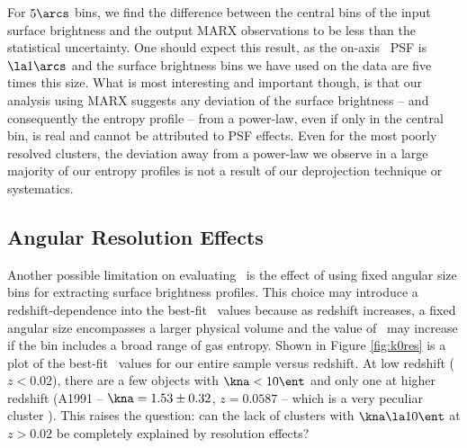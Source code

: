 For $5\arcs$ bins, we find the difference between the central bins
of the input surface brightness and the output MARX observations to be
less than the statistical uncertainty. One should expect this result,
as the on-axis \chandra\ PSF is $\la 1\arcs$ and the surface
brightness bins we have used on the data are five times this
size. What is most interesting and important though, is that our
analysis using MARX suggests any deviation of the surface brightness
-- and consequently the entropy profile -- from a power-law, even if
only in the central bin, is real and cannot be attributed to PSF
effects. Even for the most poorly resolved clusters, the deviation
away from a power-law we observe in a large majority of our entropy
profiles is not a result of our deprojection technique or systematics.

\subsection{Angular Resolution Effects}
\label{sec:entsuppangres}

Another possible limitation on evaluating \kna\ is the effect of using
fixed angular size bins for extracting surface brightness
profiles. This choice may introduce a redshift-dependence into the
best-fit \kna\ values because as redshift increases, a fixed angular
size encompasses a larger physical volume and the value of \kna\ may
increase if the bin includes a broad range of gas entropy. Shown in
Figure \ref{fig:k0res} is a plot of the best-fit \kna\ values for our
entire sample versus redshift. At low redshift ($z < 0.02$), there are
a few objects with $\kna < 10 \ent$ and only one at higher redshift
(A1991 -- $\kna = 1.53 \pm 0.32$, $z = 0.0587$ -- which is a very
peculiar cluster \citep{2004ApJ...613..180S}). This raises the
question: can the lack of clusters with $\kna \la 10 \ent$ at $z >
0.02$ be completely explained by resolution effects?

